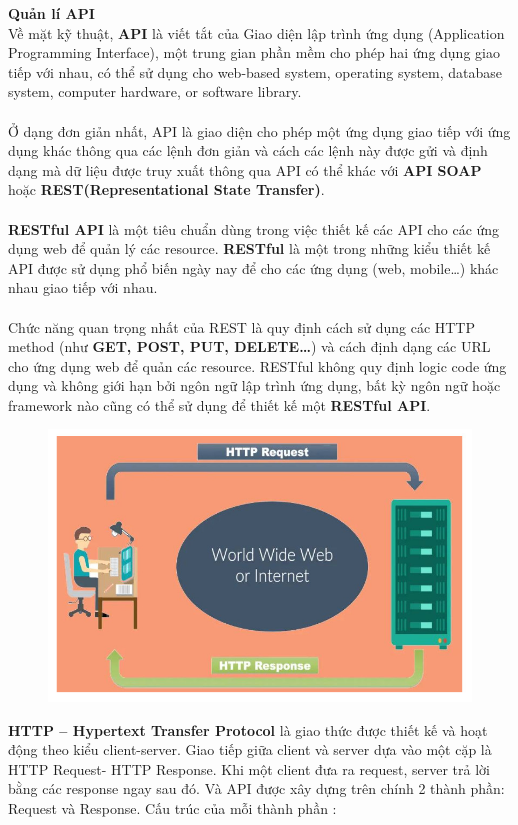 \documentclass[a4paper]{article}
\begin{document}
\noindent \textbf{Quản lí API}\\
Về mặt kỹ thuật, \textbf{API} là viết tắt của Giao diện lập trình ứng dụng (Application Programming Interface), một trung gian phần mềm cho phép hai ứng dụng giao tiếp với nhau, có thể sử dụng cho web-based system, operating system, database system, computer hardware, or software library. \\\\
Ở dạng đơn giản nhất, API là giao diện cho phép một ứng dụng giao tiếp với ứng dụng khác thông qua các lệnh đơn giản và cách các lệnh này được gửi và định dạng mà dữ liệu được truy xuất thông qua API có thể khác với \textbf{API SOAP} hoặc \textbf{REST(Representational State Transfer)}.\\\\
\textbf{RESTful API} là một tiêu chuẩn dùng trong việc thiết kế các API cho các ứng dụng web để quản lý các resource. \textbf{RESTful} là một trong những kiểu thiết kế API được sử dụng phổ biến ngày nay để cho các ứng dụng (web, mobile…) khác nhau giao tiếp với nhau.\\\\
Chức năng quan trọng nhất của REST là quy định cách sử dụng các HTTP method (như \textbf{GET, POST, PUT, DELETE…}) và cách định dạng các URL cho ứng dụng web để quản các resource. RESTful không quy định logic code ứng dụng và không giới hạn bởi ngôn ngữ lập trình ứng dụng, bất kỳ ngôn ngữ hoặc framework nào cũng có thể sử dụng để thiết kế một \textbf{RESTful API}.\\
\begin{figure}[h!]
\begin{center}
\includegraphics[width=12cm]{picture/anh 1.jpg}
\end{center}
\end{figure}
\clearpage
\noindent \textbf{HTTP – Hypertext Transfer Protocol }là giao thức được thiết kế và hoạt động theo kiểu client-server. Giao tiếp giữa client và server dựa vào một cặp là HTTP Request- HTTP Response. Khi một client đưa ra request, server trả lời bằng các response ngay sau đó. Và API được xây dựng trên chính 2 thành phần: Request và Response. Cấu trúc của mỗi thành phần :\\
\end{document}
